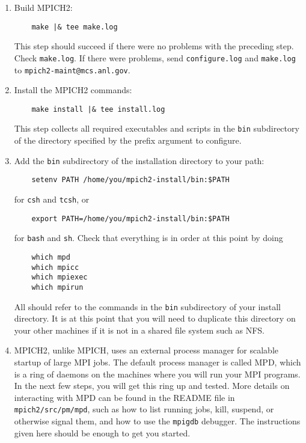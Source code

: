 \documentclass[dvipdfm,11pt]{article}
\begin{document}
\begin{enumerate}
\item
Build MPICH2:
\begin{verbatim}
    make |& tee make.log
\end{verbatim}
This step should succeed if there were no problems with the preceding
step.  Check \texttt{make.log}.  If there were problems, send
\texttt{configure.log} and \texttt{make.log} to
\texttt{mpich2-maint@mcs.anl.gov}.

\item
Install the MPICH2 commands:
\begin{verbatim}
    make install |& tee install.log
\end{verbatim}
This step collects all required executables and scripts in the \texttt{bin}
subdirectory of the directory specified by the prefix argument to
configure. 

\item
Add the \texttt{bin} subdirectory of the installation directory to your path:
\begin{verbatim}
    setenv PATH /home/you/mpich2-install/bin:$PATH
\end{verbatim}
for \texttt{csh} and \texttt{tcsh}, or 
\begin{verbatim}
    export PATH=/home/you/mpich2-install/bin:$PATH
\end{verbatim}
for \texttt{bash} and \texttt{sh}.  Check that everything is in order at
this point by doing
\begin{verbatim}
    which mpd
    which mpicc
    which mpiexec
    which mpirun
\end{verbatim}
All should refer to the commands in the \texttt{bin} subdirectory of your
install directory.  It is at this point that you will need to
duplicate this directory on your other machines if it is not
in a shared file system such as NFS.

\item
MPICH2, unlike MPICH, uses an external process manager for scalable
startup of large MPI jobs.  The default process manager is called
MPD, which is a ring of daemons on the machines where you will run
your MPI programs.  In the next few steps, you will get this ring up
and tested.  More details on interacting with MPD can be found in
the README file in \texttt{mpich2/src/pm/mpd}, such as how to list
running jobs, kill, suspend, or otherwise signal them, and how to
use the \texttt{mpigdb} debugger.  The instructions given here should be
enough to get you started.


\end{enumerate}
\end{document}
